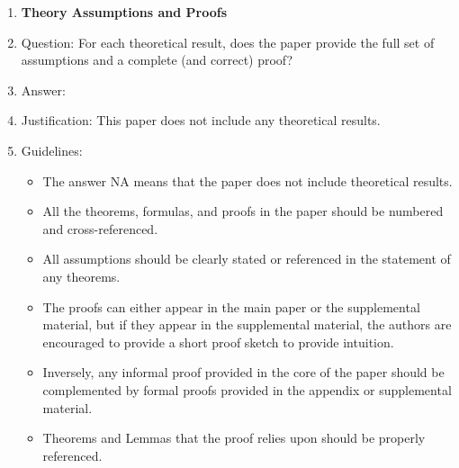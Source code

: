 \documentclass{article}
\begin{document}
\begin{enumerate}
\item {\bf Theory Assumptions and Proofs}
    \item[] Question: For each theoretical result, does the paper provide the full set of assumptions and a complete (and correct) proof?
    \item[] Answer: \answerNA{} %
    \item[] Justification: This paper does not include any theoretical results.
    \item[] Guidelines:
    \begin{itemize}
        \item The answer NA means that the paper does not include theoretical results. 
        \item All the theorems, formulas, and proofs in the paper should be numbered and cross-referenced.
        \item All assumptions should be clearly stated or referenced in the statement of any theorems.
        \item The proofs can either appear in the main paper or the supplemental material, but if they appear in the supplemental material, the authors are encouraged to provide a short proof sketch to provide intuition. 
        \item Inversely, any informal proof provided in the core of the paper should be complemented by formal proofs provided in the appendix or supplemental material.
        \item Theorems and Lemmas that the proof relies upon should be properly referenced. 
    \end{itemize}


\end{enumerate}
\end{document}
